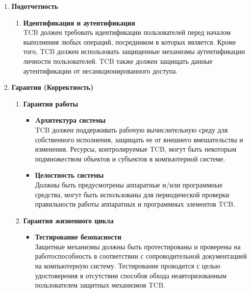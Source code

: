 \begin{enumerate}
\begin{enumerate}
\begin{enumerate}
\begin{enumerate}
				(\textit{напр.} self/group/other контроль, ACL) должны позволять пользователям определять и контролировать общий доступ к объектам именованными субъектами и/или определенной группой
				субъектов.
			\end{enumerate}
			\item{\textbf{Подотчетность}}
			\begin{enumerate}
				\item{\textbf{Идентификация и аутентификация}}\\
				TCB должен требовать идентификации пользователей перед началом выполнения любых операций, посредником в которых является. Кроме того, TCB должен использовать защищенные механизмы
				аутентификации личности пользователей. TCB также должен защищать данные аутентификации от несанкционированного доступа.
			\end{enumerate}
			\item{\textbf{Гарантия (Корректность)}}
			\begin{enumerate}
				\item{\textbf{Гарантия работы}}
				\begin{itemize}
					\item{\textbf{Aрхитектура системы}}\\
					TCB должен поддерживать рабочую вычислительную среду для собственного исполнения, защищать ее от внешнего вмешательства и изменения. Ресурсы, контролируемые TCB, могут быть
					некоторым подмножеством объектов и субъектов в компьютерной системе.
					\item{\textbf{Целостность системы}}\\
					Должны быть предусмотрены аппаратные и/или программные средства, могут быть использованы для периодической проверки правильности работы аппаратных и программных элементов TCB.
				\end{itemize}
				\item{\textbf{Гарантия жизненного цикла}}
				\begin{itemize}
					\item{\textbf{Тестирование безопасности}}\\
					Защитные механизмы должны быть протестированы и проверены на работоспособность в соответствии с сопроводительной документацией на компьютерную систему.
					Тестирование проводится с целью удостоверения в отсутствии способов обхода неавторизованным пользователем защитных механизмов TCB.
				\end{itemize}
			\end{enumerate}
		\end{enumerate}

\end{enumerate}
\end{enumerate}
